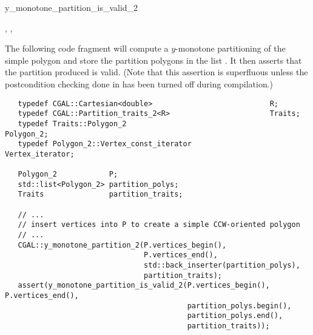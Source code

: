 \begin{ccRefFunction}{y_monotone_partition_is_valid_2}
\ccSeeAlso

,
,

\ccExample

The following code fragment will compute a $y$-monotone
partitioning of the simple polygon  
and store the partition polygons in the list .
It then asserts that the partition produced is valid.
(Note that this assertion is superfluous unless the postcondition checking
done in  has been turned off during
compilation.)

\begin{verbatim}
   typedef CGAL::Cartesian<double>                           R;
   typedef CGAL::Partition_traits_2<R>                       Traits;
   typedef Traits::Polygon_2                                 Polygon_2;
   typedef Polygon_2::Vertex_const_iterator                  Vertex_iterator;

   Polygon_2            P;
   std::list<Polygon_2> partition_polys;
   Traits               partition_traits;

   // ...
   // insert vertices into P to create a simple CCW-oriented polygon
   // ...
   CGAL::y_monotone_partition_2(P.vertices_begin(),
                                P.vertices_end(),
                                std::back_inserter(partition_polys),
                                partition_traits);
   assert(y_monotone_partition_is_valid_2(P.vertices_begin(), P.vertices_end(),
                                          partition_polys.begin(), 
                                          partition_polys.end(),
                                          partition_traits));
\end{verbatim}

\end{ccRefFunction}
\renewcommand\ccRefPageBegin{\ccParDims\cgalColumnLayout}
\renewcommand\ccRefPageEnd{\ccParDims\cgalColumnLayout}
